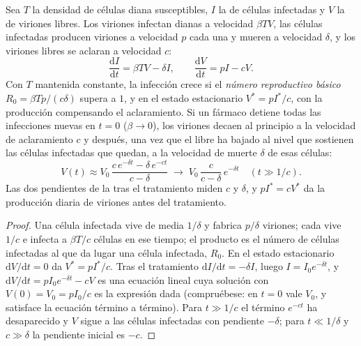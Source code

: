 \begin{theorem}\label{thm:b3:virology:dynamics}
Sea $T$ la densidad de células diana susceptibles, $I$ la de células
infectadas y $V$ la de viriones libres. Los viriones infectan dianas a
velocidad $\beta TV$, las células infectadas producen viriones a
velocidad $p$ cada una y mueren a velocidad $\delta$, y los viriones
libres se aclaran a velocidad $c$:
\[
\frac{\mathrm{d}I}{\mathrm{d}t} = \beta TV - \delta I, \qquad
\frac{\mathrm{d}V}{\mathrm{d}t} = pI - cV .
\]
Con $T$ mantenida constante, la infección crece si el \emph{número
reproductivo básico} $R_{0} = \beta Tp/(c\delta)$ supera a $1$, y en el
estado estacionario $V^{*} = p I^{*}/c$, con la producción compensando el
aclaramiento. Si un fármaco detiene todas las infecciones nuevas en
$t = 0$ ($\beta \to 0$), los viriones decaen al principio a la velocidad
de aclaramiento $c$ y después, una vez que el  libre ha bajado al
nivel que sostienen las células infectadas que quedan, a la velocidad de
muerte $\delta$ de esas células:
\[
V(t) \approx V_{0}\,\frac{c\,e^{-\delta t} - \delta\,e^{-ct}}{c - \delta}
\;\longrightarrow\; V_{0}\,\frac{c}{c-\delta}\,e^{-\delta t}
\quad (t \gg 1/c).
\]
Las dos pendientes de la  tras el tratamiento miden $c$ y
$\delta$, y $pI^{*} = cV^{*}$ da la producción diaria de viriones antes
del tratamiento.
\end{theorem}
\begin{proof}
Una célula infectada vive de media $1/\delta$ y fabrica $p/\delta$
viriones; cada  vive $1/c$ e infecta a $\beta T/c$ células en ese
tiempo; el producto es el número de células infectadas al que da lugar
una célula infectada, $R_{0}$. En el estado estacionario
$\mathrm{d}V/\mathrm{d}t = 0$ da $V^{*} = pI^{*}/c$. Tras el tratamiento
$\mathrm{d}I/\mathrm{d}t =
-\delta I$, luego $I = I_{0}e^{-\delta t}$, y $\mathrm{d}V/\mathrm{d}t =
pI_{0}e^{-\delta t} - cV$ es una ecuación lineal cuya solución con
$V(0) = V_{0} = pI_{0}/c$ es la expresión dada (compruébese: en $t = 0$
vale $V_{0}$, y satisface la ecuación término a término). Para $t
\gg 1/c$ el término $e^{-ct}$ ha desaparecido y $V$ sigue a las células
infectadas con pendiente $-\delta$; para $t \ll 1/\delta$ y
$c \gg \delta$ la pendiente inicial es $-c$.
\end{proof}

